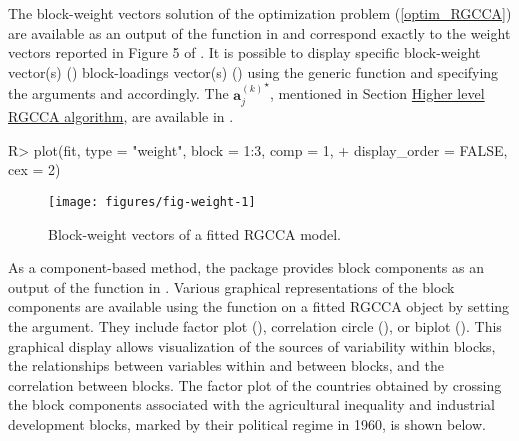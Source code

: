 \documentclass[
]{jss}
\begin{document}
\normalsize

The block-weight vectors solution of the optimization problem
(\ref{optim_RGCCA}) are available as an output of the 
function in  and correspond exactly to the weight vectors
reported in Figure 5 of \cite{Tenenhaus2011}. It is possible to display
specific block-weight vector(s) () block-loadings
vector(s) () using the generic 
function and specifying the arguments  and 
accordingly. The \({ \mathbf a_j^{(k)}}^\star\), mentioned in Section
\hyperref[higher-level-rgcca-algorithm]{Higher level RGCCA algorithm},
are available in .

\footnotesize

\begin{CodeChunk}
\begin{CodeInput}
R> plot(fit, type = "weight", block = 1:3, comp = 1,
+      display_order = FALSE, cex = 2)
\end{CodeInput}
\begin{figure}[H]

{\centering \texttt{[image: figures/fig-weight-1]} 

}

\caption[Block-weight vectors of a fitted RGCCA model]{Block-weight vectors of a fitted RGCCA model.}\label{fig:fig-weight}
\end{figure}
\end{CodeChunk}

\normalsize

As a component-based method, the  package provides block
components as an output of the  function in .
Various graphical representations of the block components are available
using the  function on a fitted RGCCA object by setting the
 argument. They include factor plot (),
correlation circle (), or biplot ().
This graphical display allows visualization of the sources of
variability within blocks, the relationships between variables within
and between blocks, and the correlation between blocks. The factor plot
of the countries obtained by crossing the block components associated
with the agricultural inequality and industrial development blocks,
marked by their political regime in 1960, is shown below.

\footnotesize
\end{document}
